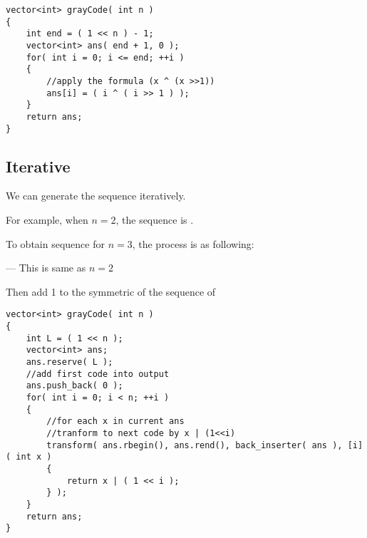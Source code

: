 \setcounter{lstlisting}{0}
\begin{lstlisting}[style=customc, caption={Math}]
vector<int> grayCode( int n )
{
    int end = ( 1 << n ) - 1;
    vector<int> ans( end + 1, 0 );
    for( int i = 0; i <= end; ++i )
    {
        //apply the formula (x ^ (x >>1))
        ans[i] = ( i ^ ( i >> 1 ) );
    }
    return ans;
}
\end{lstlisting}

\subsection{Iterative}
We can generate the sequence iteratively. 

For example, when $n=2$, the sequence is .

To obtain sequence for $n=3$, the process is as following:

 --- This is same as $n=2$

Then add 1 to the symmetric of the sequence of 


\begin{lstlisting}[style=customc, caption={Iteratively Generating}]
vector<int> grayCode( int n )
{
    int L = ( 1 << n );
    vector<int> ans;
    ans.reserve( L );
    //add first code into output
    ans.push_back( 0 );
    for( int i = 0; i < n; ++i )
    {
        //for each x in current ans
        //tranform to next code by x | (1<<i)
        transform( ans.rbegin(), ans.rend(), back_inserter( ans ), [i]( int x )
        {
            return x | ( 1 << i );
        } );
    }
    return ans;
}
\end{lstlisting}